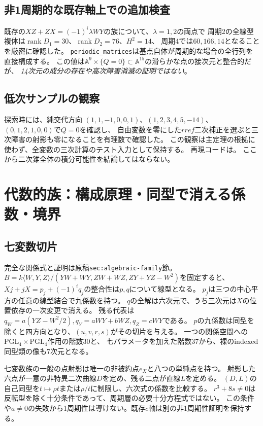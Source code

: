 \documentclass[11pt,a4paper]{ltjsarticle}
\begin{document}
\subsection*{非1周期的な既存軸上での追加検査}
既存の$XZ+ZX=(-1)^i\lambda WY$の族について、$\lambda=1,2$の両点で
周期2の全線型複体は$\operatorname{rank}D_1=30$、$\operatorname{rank}D_2=76$、$H^2=14$、
周期4では$60,166,14$となることを厳密に確認した。
\texttt{periodic\_matrices}は基点自体が周期的な場合の全行列を直接構成する。
この値は$\mathbb A^9\times\{Q=0\}\subset\mathbb A^{15}$の滑らかな点の接次元と整合的だが、
\emph{14次元の成分の存在や高次障害消滅の証明ではない}。

\subsection*{低次サンプルの観察}
探索時には、純交代方向
$(1,1,-1,0,0,1)$、$(1,2,3,4,5,-14)$、$(0,1,2,1,0,0)$で$Q=0$を確認し、
自由変数を零にした$rref$二次補正を選ぶと三次障害の射影も零になることを有理数で確認した。
この観察は主定理の根拠に使わず、全変数の三次計算のテスト入力として保持する。
再現コードは。
ここから二次錐全体の積分可能性を結論してはならない。

\section{代数的族：構成原理・同型で消える係数・境界}
\subsection*{七変数切片}
完全な関係式と証明は原稿\texttt{sec:algebraic-family}節。
$B=k\langle W,Y,Z\rangle/(YW+WY,ZW+WZ,ZY+YZ-W^2)$を固定すると、
$Xj+jX=p_j+(-1)^iq_j$の整合性は$p,q$について線型となる。
$p_j$は三つの中心平方の任意の線型結合で九係数を持つ。
$q$の全解は六次元で、うち三次元は$X$の位置依存の一次変更で消える。
残る代表は$q_W=a(YZ-W^2/2),q_Y=aWY+bWZ,q_Z=cWY$である。
$p$の九係数は同型を除くと四方向となり、$(u,v,r,s)$がその切片を与える。
一つの関係空間への$\mathrm{PGL}_4\times\mathrm{PGL}_4$作用の階数30と、
七パラメータを加えた階数37から、裸のindexed同型類の像も7次元となる。

七変数族の一般の点射影は唯一の非被約点$e_X$と八つの単純点を持つ。
射影した六点が一意の非特異二次曲線$D$を定め、残る二点が直線$L$を定める。
$(D,L)$の自己同型を$t\mapsto\rho t$または$\rho/t$に制限し、六次式の係数を比較する。
$r^3+8s\ne0$は反転型を除く十分条件であって、周期層の必要十分方程式ではない。
この条件や$a\ne0$の失敗から1周期性は導けない。既存$c$軸は別の非1周期性証明を保持する。
\end{document}
